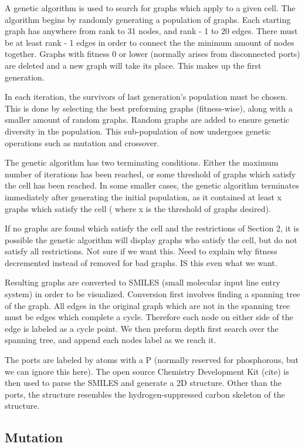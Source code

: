\documentclass[12pt]{article}
\begin{document}
A genetic algorithm is used to search for graphs which apply to a given cell. The algorithm begins by randomly generating a population of graphs. Each starting graph has anywhere from rank to 31 nodes, and rank - 1 to 20 edges. There must be at least rank - 1 edges in order to connect the the minimum amount of nodes together. Graphs with fitness 0 or lower (normally arises from disconnected ports) are deleted and a new graph will take its place. This makes up the first generation.

In each iteration, the survivors of last generation's population must be chosen. This is done by selecting the best preforming graphs (fitness-wise), along with a smaller amount of random graphs. Random graphs are added to ensure genetic diversity in the population. This sub-population of now undergoes genetic operations such as mutation and crossover. 

The genetic algorithm has two terminating conditions. Either the maximum number of iterations has been reached, or some threshold of graphs which satisfy the cell has been reached. In some smaller cases, the genetic algorithm terminates immediately after generating the initial population, as it contained at least x graphs which satisfy the cell ( where x is the threshold of graphs desired).

If no graphs are found which satisfy the cell and the restrictions of Section 2, it is possible the genetic algorithm will display graphs who satisfy the cell, but do not satisfy all restrictions. Not sure if we want this. Need to explain why fitness decremented instead of removed for bad graphs. IS this even what we want.

Resulting graphs are converted to SMILES (small molecular input line entry system) in order to be visualized. Conversion first involves finding a spanning tree of the graph. All edges in the original graph which are not in the spanning tree must be edges which complete a cycle. Therefore each node on either side of the edge is labeled as a cycle point. We then preform depth first search over the spanning tree, and append each nodes label as we reach it.

The ports are labeled by atoms with a P (normally reserved for phosphorous, but we can ignore this here). The open source Chemistry Development Kit (cite) is then used to parse the SMILES and generate a 2D structure. Other than the ports, the structure resembles the hydrogen-suppressed carbon skeleton of the structure.  

\subsection{Mutation}
\end{document}
